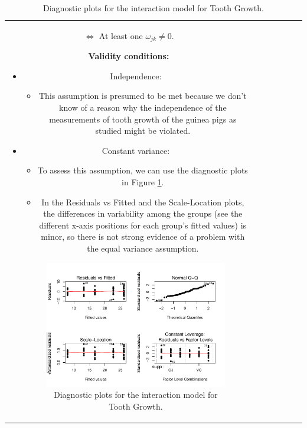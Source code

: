\documentclass[]{book}
\newenvironment{Shaded}{\begin{snugshade}}{\end{snugshade}}
\providecommand{\tightlist}{%
  \setlength{\itemsep}{0pt}\setlength{\parskip}{0pt}}
\theoremstyle{definition}
\theoremstyle{definition}
\theoremstyle{remark}
\begin{document}
\begin{longtable}[]{@{}ccccccc@{}}
\begin{minipage}[b]{0.10\columnwidth}
\begin{Shaded}
\begin{Highlighting}[]
\begin{Shaded}
\begin{Highlighting}[]
\begin{enumerate}
\begin{Shaded}
\begin{Highlighting}[]
  \(\Leftrightarrow\) At least one \(\omega_{jk}\ne 0\).
\item
  \textbf{Validity conditions:}

  \begin{itemize}
  \item
    Independence:

    \begin{itemize}
    \tightlist
    \item
      This assumption is presumed to be met because we don't know of a
      reason why the independence of the measurements of tooth growth of
      the guinea pigs as studied might be violated.
    \end{itemize}
  \item
    Constant variance:

    \begin{itemize}
    \item
      To assess this assumption, we can use the diagnostic plots in
      Figure \ref{fig:Figure4-9}.
    \item
      In the Residuals vs Fitted and the Scale-Location plots, the
      differences in variability among the groups (see the different
      x-axis positions for each group's fitted values) is minor, so
      there is not strong evidence of a problem with the equal variance
      assumption.
    \end{itemize}

    \begin{figure}
    \centering
    \includegraphics{04-twoWayAnova_files/figure-latex/Figure4-9-1.pdf}
    \caption{\label{fig:Figure4-9}Diagnostic plots for the interaction model
    for Tooth Growth.}
    \end{figure}


\end{itemize}
\end{Highlighting}
\end{Shaded}
\end{enumerate}
\end{Highlighting}
\end{Shaded}
\end{Highlighting}
\end{Shaded}
\end{minipage}
\end{longtable}
\end{document}
